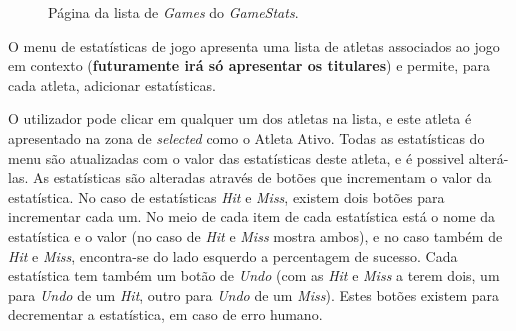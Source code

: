 \begin{figure}[h]
	\begin{center}
	\end{center}
	\caption{Página da lista de \textit{Games} do \textit{GameStats}.}\label{fig:gamestatslist}
\end{figure}

O menu de estatísticas de jogo apresenta uma lista de atletas associados ao jogo em contexto (\textbf{futuramente irá só apresentar os titulares}) e permite, para cada atleta, adicionar estatísticas. 

O utilizador pode clicar em qualquer um dos atletas na lista, e este atleta é apresentado na zona de \textit{selected} como o Atleta Ativo. Todas as estatísticas do menu são atualizadas com o valor das estatísticas deste atleta, e é possivel alterá-las. As estatísticas são alteradas através de botões que incrementam o valor da estatística. No caso de estatísticas \textit{Hit} e \textit{Miss}, existem dois botões para incrementar cada um. No meio de cada item de cada estatística está o nome da estatística e o valor (no caso de \textit{Hit} e \textit{Miss} mostra ambos), e no caso também de \textit{Hit} e \textit{Miss}, encontra-se do lado esquerdo a percentagem de sucesso. Cada estatística tem também um botão de \textit{Undo} (com as \textit{Hit} e \textit{Miss} a terem dois, um para \textit{Undo} de um \textit{Hit}, outro para \textit{Undo} de um \textit{Miss}). Estes botões existem para decrementar a estatística, em caso de erro humano.
\newpage

